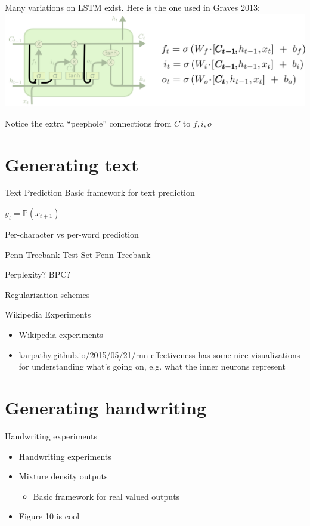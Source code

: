 \documentclass[10pt,xcolor=dvipsnames]{beamer}
\def\bbP{\mathbb{P}}
\begin{document}
\begin{frame}{}
  Many variations on LSTM exist. Here is the one used
  in Graves 2013:
  \includegraphics[width=\linewidth]{fig/LSTM3-var-peepholes.png}

  Notice the extra ``peephole'' connections from
  $C$ to $f, i, o$
\end{frame}


\section{Generating text}

\begin{frame}{Text Prediction}
  Basic framework for text prediction

  $y_t = \bbP(x_{t+1})$
  
  Per-character vs per-word prediction
\end{frame}

\begin{frame}{Penn Treebank Test Set}
  Penn Treebank
  
  Perplexity? BPC?

  Regularization schemes
\end{frame}

\begin{frame}{Wikipedia Experiments}
  \begin{itemize}
  \item   Wikipedia experiments
  \item \url{karpathy.github.io/2015/05/21/rnn-effectiveness} has some nice
    visualizations for understanding what's going on, e.g. what the inner
    neurons represent
  \end{itemize}
\end{frame}

\section{Generating handwriting}

\begin{frame}{Handwriting experiments}
  \begin{itemize}
  \item 
 Handwriting experiments 
 \item
 Mixture density outputs
 \begin{itemize}
 \item Basic framework for real valued outputs
 \end{itemize}
\item 
 Figure 10 is cool
  \end{itemize}
\end{frame}
\end{document}
